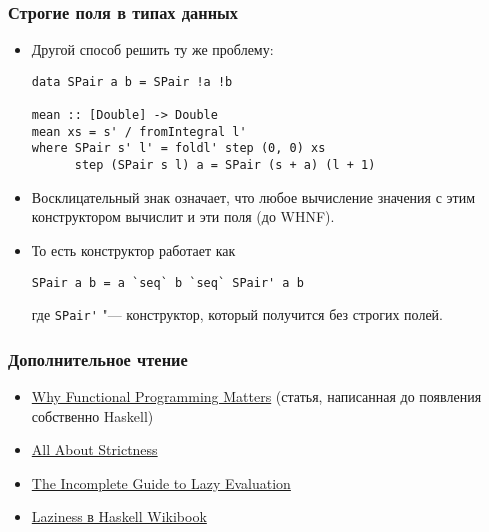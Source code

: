 \documentclass[11pt]{beamer}
\begin{document}
\begin{frame}[fragile]
  \frametitle{Строгие поля в типах данных}
  \begin{itemize}
    \item Другой способ решить ту же проблему:
          \begin{lstlisting}[escapeinside=||,basicstyle=\ttfamily\footnotesize]
data SPair a b = SPair !a !b

mean :: [Double] -> Double
mean xs = s' / fromIntegral l'
where SPair s' l' = foldl' step (0, 0) xs
      step (SPair s l) a = SPair (s + a) (l + 1)
\end{lstlisting}
          \pause
    \item Восклицательный знак означает, что любое вычисление значения с этим конструктором вычислит и эти поля (до WHNF).
    \item То есть конструктор работает как
          \begin{lstlisting}[escapeinside=||,basicstyle=\ttfamily\footnotesize]
SPair a b = a `seq` b `seq` SPair' a b
\end{lstlisting}
          где \lstinline|SPair'| "--- конструктор, который получится без строгих полей.
  \end{itemize}
\end{frame}

\begin{frame}[fragile]
  \frametitle{Дополнительное чтение}
  \begin{itemize}
    \item \href{https://blog.acolyer.org/2016/09/14/why-functional-programming-matters/}{Why Functional Programming Matters} (статья, написанная до появления собственно Haskell)
    \item \href{https://www.fpcomplete.com/blog/2017/09/all-about-strictness}{All About Strictness}
    \item \href{https://apfelmus.nfshost.com/articles/lazy-eval.html}{The Incomplete Guide to Lazy Evaluation}
    \item \href{https://en.wikibooks.org/wiki/Haskell/Laziness}{Laziness в Haskell Wikibook}
  \end{itemize}
\end{frame}
\end{document}
